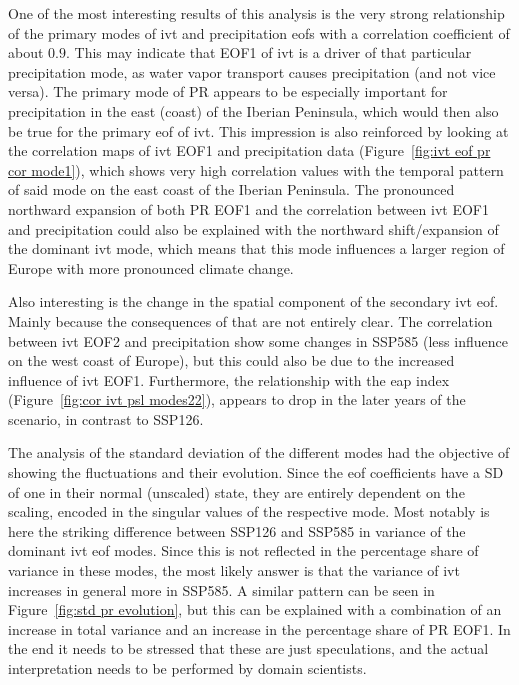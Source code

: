 One of the most interesting results of this analysis is the very strong relationship of the primary modes of \ac{ivt} and precipitation \acp{eof} with a correlation coefficient of about $0.9$.
This may indicate that EOF1 of \ac{ivt} is a driver of that particular precipitation mode, as water vapor transport causes precipitation (and not vice versa). 
The primary mode of PR appears to be especially important for precipitation in the east (coast) of the Iberian Peninsula, which would then also be true for the primary \ac{eof} of \ac{ivt}. 
This impression is also reinforced by looking at the correlation maps of \ac{ivt} EOF1 and precipitation data (Figure~\ref{fig:ivt eof pr cor mode1}), which shows very high correlation values with the temporal pattern of said mode on the east coast of the Iberian Peninsula. 
The pronounced northward expansion of both PR EOF1 and the correlation between \ac{ivt} EOF1 and precipitation could also be explained with the northward shift/expansion of the dominant \ac{ivt} mode, which means that this mode influences a larger region of Europe with more pronounced climate change. 

Also interesting is the change in the spatial component of the secondary \ac{ivt} \ac{eof}. 
Mainly because the consequences of that are not entirely clear. 
The correlation between \ac{ivt} EOF2 and precipitation show some changes in SSP585 (less influence on the west coast of Europe), but this could also be due to the increased influence of \ac{ivt} EOF1. 
Furthermore, the relationship with the \ac{eap} index (Figure~\ref{fig:cor ivt psl modes22}), appears to drop in the later years of the scenario, in contrast to SSP126. 

The analysis of the standard deviation of the different modes had the objective of showing the fluctuations and their evolution. 
Since the \ac{eof} coefficients have a SD of one in their normal (unscaled) state, they are entirely dependent on the scaling, encoded in the singular values of the respective mode. 
Most notably is here the striking difference between SSP126 and SSP585 in variance of the dominant \ac{ivt} \ac{eof} modes. 
Since this is not reflected in the percentage share of variance in these modes, the most likely answer is that the variance of \ac{ivt} increases in general more in SSP585.
A similar pattern can be seen in Figure~\ref{fig:std pr evolution}, but this can be explained with a combination of an increase in total variance and an increase in the percentage share of PR EOF1. 
In the end it needs to be stressed that these are just speculations, and the actual interpretation needs to be performed by domain scientists. 


